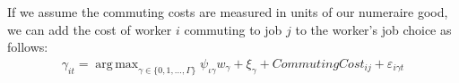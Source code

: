 \documentclass[12pt]{article}
\def\ig{\iota\gamma}
\def\g{\gamma}
\DeclareMathOperator*{\argmax}{arg\,max}
\theoremstyle{definition}
\theoremstyle{plain}
\def\ve{\varepsilon}
\begin{document}

If we assume the commuting costs are measured in units of our numeraire good, we can add the cost of worker $i$ commuting to job $j$ to the worker's job choice as follows:
\begin{align*}
\g_{it} = \argmax_{\g \in \{0,1,\dots,\Gamma\}} \psi_{\ig} w_{\g} + \xi_{\g} + CommutingCost_{ij}+ \ve_{i\g t}
\end{align*}
\end{document}
